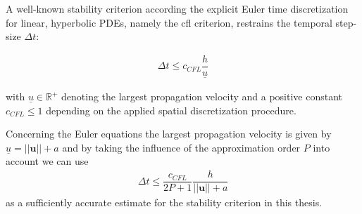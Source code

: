 	
	A well-known stability criterion according the explicit Euler time discretization for linear, hyperbolic PDEs, namely the \gls{cfl} criterion, restrains the temporal step-size $\Delta t$:
	
	\begin{align}
		\Delta t \leq c_{CFL} \dfrac{h}{\underline{u}}
	\end{align}
	
	with $\underline{u} \in \mathbb{R}^+$ denoting the largest propagation velocity and a positive constant $c_{CFL} \leq 1$ depending on the applied spatial discretization procedure.
	
	Concerning the Euler equations the largest propagation velocity is given by $\underline{u} = ||\mathbf{u} || + a$ and by taking the influence of the approximation order $P$ into account we can use 
	\begin{align}
		\Delta t \leq \dfrac{c_{CFL}}{2P+1} \dfrac{h}{||\mathbf{u} || + a}
	\end{align}
	as a sufficiently accurate estimate for the stability criterion in this thesis. 
